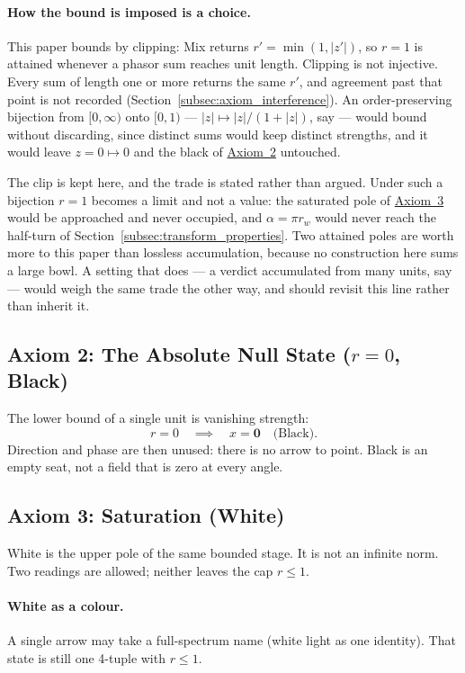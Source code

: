 \documentclass[12pt, a4paper]{article}
\begin{document}
\paragraph{How the bound is imposed is a choice.}
This paper bounds by clipping: Mix returns $r'=\min(1,|z'|)$, so
$r=1$ is attained whenever a phasor sum reaches unit length. Clipping
is not injective. Every sum of length one or more returns the same
$r'$, and agreement past that point is not recorded
(Section~\ref{subsec:axiom_interference}). An order-preserving
bijection from $[0,\infty)$ onto $[0,1)$ --- $|z|\mapsto|z|/(1+|z|)$,
say --- would bound without discarding, since distinct sums would keep
distinct strengths, and it would leave $z=0\mapsto 0$ and the black of
\hyperref[subsec:axiom_null]{Axiom~2} untouched.

The clip is kept here, and the trade is stated rather than argued.
Under such a bijection $r=1$ becomes a limit and not a value: the
saturated pole of \hyperref[subsec:axiom_white]{Axiom~3} would be approached
and never occupied, and $\alpha=\pi r_w$ would never reach the
half-turn of Section~\ref{subsec:transform_properties}. Two attained
poles are worth more to this paper than lossless accumulation, because
no construction here sums a large bowl. A setting that does --- a
verdict accumulated from many units, say --- would weigh the same
trade the other way, and should revisit this line rather than inherit
it.

\subsection{Axiom 2: The Absolute Null State ($r = 0$, Black)}
\label{subsec:axiom_null}
The lower bound of a single unit is vanishing strength:
\begin{equation}
    r = 0 \quad \implies \quad x = \mathbf{0}
    \quad \text{(Black)}.
    \label{eq:null_state}
\end{equation}
Direction and phase are then unused: there is no arrow to point.
Black is an empty seat, not a field that is zero at every angle.

\subsection{Axiom 3: Saturation (White)}
\label{subsec:axiom_white}
White is the upper pole of the same bounded stage. It is not an infinite
norm. Two readings are allowed; neither leaves the cap $r\le 1$.

\paragraph{White as a colour.}
A single arrow may take a full-spectrum name (white light as one
identity). That state is still one 4-tuple with $r\le 1$.
\end{document}
